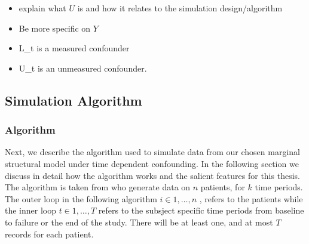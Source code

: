 \documentclass[11pt]{article}
\providecommand{\tightlist}{%
      \setlength{\itemsep}{0pt}\setlength{\parskip}{0pt}}
\begin{document}
\begin{itemize}
\tightlist
\item
  explain what \(U\) is and how it relates to the simulation
  design/algorithm
\item
  Be more specific on \(Y\)
\item
  L\_t is a measured confounder
\item
  U\_t is an unmeasured confounder.
\end{itemize}

\subsection{Simulation Algorithm}\label{simulation-algorithm}

\subsubsection{Algorithm}\label{algorithm}

Next, we describe the algorithm used to simulate data from our chosen
marginal structural model under time dependent confounding. In the
following section we discuss in detail how the algorithm works and the
salient features for this thesis. The algorithm is taken from
\citet{Havercroft2012} who generate data on \(n\) patients, for \(k\)
time periods. The outer loop in the following algorithm
\(i \in {1, \dots, n}\) , refers to the patients while the inner loop
\(t \in {1, \dots, T}\) refers to the subsject specific time periods
from baseline to failure or the end of the study. There will be at least
one, and at most \(T\) records for each patient.
\end{document}

